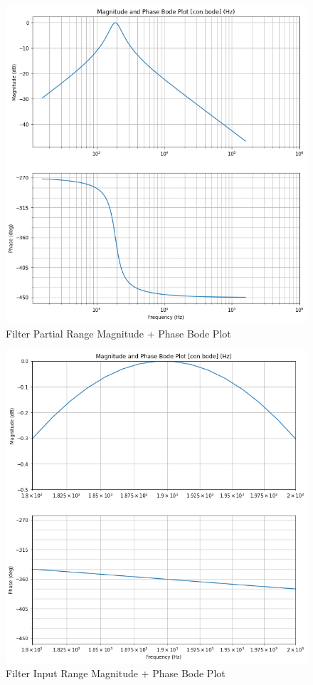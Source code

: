 \documentclass[12pt]{report}
\begin{document}
\begin{figure}[h!]
  \centering
  \includegraphics[width=\linewidth]{MPFB.png}
  \caption{Filter Partial Range Magnitude + Phase Bode Plot}
  \label{fig: MPFB}
\end{figure}
\begin{figure}[h!]
  \centering
  \includegraphics[width=\linewidth]{IRFB.png}
  \caption{Filter Input Range Magnitude + Phase Bode Plot}
  \label{fig: IRFB}
\end{figure}
\end{document}
